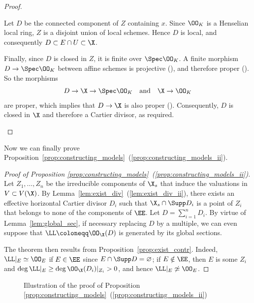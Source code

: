 \begin{proof}
\begin{enumerate}[(a)]
            Let $D$ be the connected component of $Z$ containing $x$.
            Since $\OO_{K}$ is a Henselian local ring, $Z$ is a disjoint union of local schemes.
            Hence $D$ is local, and consequently $D \subset E \cap U \subset \X$. %

            Finally, since $D$ is closed in $Z$, it is finite over $\Spec \OO_K$.
            A finite morphism $D \to \Spec \OO_K$ between affine schemes is projective (\cite[Exercise 3.3.22]{Liu}),
            and therefore proper (\cite[Theorem 3.3.30]{Liu}).
            So the morphisms
            \[
                D \to \X \to \Spec \OO_K \quad
                \textrm{and} \quad
                \X \to \OO_K
            \]
            are proper, which implies that $D \to \X$ is also proper (\cite[Proposition 3.3.16(e)]{Liu}). Consequently, $D$ is closed in $\X$ and therefore a Cartier divisor, as required.
    \end{enumerate}
\end{proof}

Now we can finally prove Proposition~\ref{prop:constructing_models}~(\ref{prop:constructing_models_ii}).

\begin{proof}[Proof of Proposition \ref{prop:constructing_models}~(\ref{prop:constructing_models_ii})]
    Let $Z_1, \dots, Z_n$ be the irreducible components of $\X_s$ that induce the valuations in $V \subset V(\X)$.
    By Lemma~\ref{lem:exist_div}~(\ref{lem:exist_div_ii}), there exists an effective horizontal Cartier divisor $D_i$
    such that $\X_s \cap \Supp D_i$ is a point of $Z_i$ that belongs to none of the components of $\EE$.
    Let $D = \sum_{i=1}^n D_i$.
    By virtue of Lemma~\ref{lem:global_sec}, if necessary replacing $D$ by a multiple, we can even suppose that
    $\LL \coloneqq \OO_\X(D)$ is generated by its global sections.

    The theorem then results from Proposition~\ref{prop:exist_contr}.
    Indeed, \(\LL|_E \simeq \OO_E\) if $E \in \EE$ since $E \cap \Supp D = \varnothing$;
    if $E \notin \EE$, then $E$ is some $Z_i$ and $\deg \LL|_E \geq \deg \OO_\X(D_i)|_{Z_i} > 0$, and hence \(\LL|_E \not\simeq \OO_E\).
\end{proof}

\begin{figure}[h!] \label{fig:illustration-of-proof-of-prop-constructing-models}
    \centering
    \caption{Illustration of the proof of Proposition \ref{prop:constructing_models}~(\ref{prop:constructing_models_ii})}
\end{figure}

